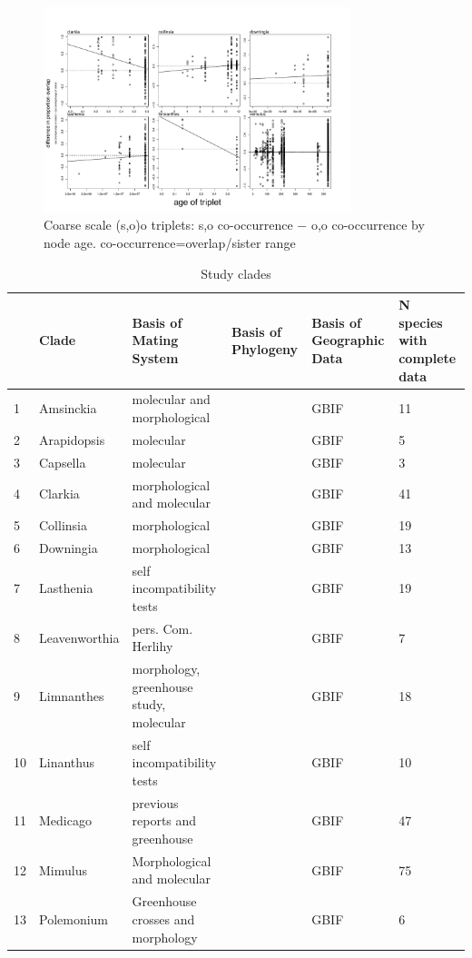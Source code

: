 \documentclass[12pt,letterpaper]{article}
\begin{document}
\begin{figure}[h!]
\centering
\caption{Coarse scale (s,o)o triplets: s,o co-occurrence $-$ o,o co-occurrence by node age. co-occurrence=overlap/sister range}
\includegraphics[width=0.8\textwidth]{tripletsAll5}
\end{figure}


\begin{table}[ht]
 \caption{Study clades}
\begin{center}
\begin{tabular}{|p{1cm}|p{2.5cm}|p{3cm}|p{3cm}|p{1cm}|p{1cm}|}
  \hline
 & Clade & Basis of Mating System & Basis of Phylogeny & Basis of Geographic Data & N species with complete data \\ 
  \hline
1 & Amsinckia & molecular and morphological &  & GBIF &  11 \\ 
  2 & Arapidopsis & molecular  &  & GBIF &   5 \\ 
  3 & Capsella & molecular  &  & GBIF &   3 \\ 
  4 & Clarkia & morphological and molecular &  & GBIF &  41 \\ 
  5 & Collinsia & morphological &  & GBIF &  19 \\ 
  6 & Downingia & morphological  &  & GBIF &  13 \\ 
  7 & Lasthenia & self incompatibility tests&  & GBIF &  19 \\ 
  8 & Leavenworthia & pers. Com. Herlihy &  & GBIF &   7 \\ 
  9 & Limnanthes & morphology, greenhouse study, molecular  &  & GBIF &  18 \\ 
  10 & Linanthus & self incompatibility tests &  & GBIF &  10 \\ 
  11 & Medicago &  previous reports and greenhouse &  & GBIF &  47 \\ 
  12 & Mimulus & Morphological and molecular &  & GBIF &  75 \\ 
  13 & Polemonium & Greenhouse crosses and morphology &  & GBIF &   6 \\ 
   \hline
\end{tabular}
\end{center}
\end{table}
\end{document}
